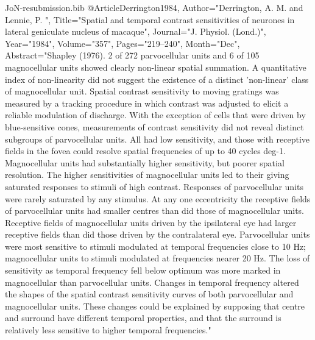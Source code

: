 \documentclass{article}
\begin{document}
\begin{filecontents}{JoN-resubmission.bib}
@Article{Derrington1984,
   Author="Derrington, A. M.  and Lennie, P. ",
   Title="{{S}patial and temporal contrast sensitivities of neurones in lateral geniculate nucleus of macaque}",
   Journal="J. Physiol. (Lond.)",
   Year="1984",
   Volume="357",
   Pages="219--240",
   Month="Dec",
   Abstract="Shapley (1976). 2 of 272 parvocellular units and 6 of 105
magnocellular units showed clearly non-linear spatial summation. A
quantitative index of non-linearity did not suggest the existence of a
distinct 'non-linear' class of magnocellular unit. Spatial contrast
sensitivity to moving gratings was measured by a tracking procedure in
which contrast was adjusted to elicit a reliable modulation of
discharge. With the exception of cells that were driven by
blue-sensitive cones, measurements of contrast sensitivity did not
reveal distinct subgroups of parvocellular units. All had low
sensitivity, and those with receptive fields in the fovea could
resolve spatial frequencies of up to 40 cycles deg-1. Magnocellular
units had substantially higher sensitivity, but poorer spatial
resolution. The higher sensitivities of magnocellular units led to
their giving saturated responses to stimuli of high
contrast. Responses of parvocellular units were rarely saturated by
any stimulus. At any one eccentricity the receptive fields of
parvocellular units had smaller centres than did those of
magnocellular units. Receptive fields of magnocellular units driven by
the ipsilateral eye had larger receptive fields than did those driven
by the contralateral eye. Parvocellular units were most sensitive to
stimuli modulated at temporal frequencies close to 10 Hz;
magnocellular units to stimuli modulated at frequencies nearer 20
Hz. The loss of sensitivity as temporal frequency fell below optimum
was more marked in magnocellular than parvocellular units. Changes in
temporal frequency altered the shapes of the spatial contrast
sensitivity curves of both parvocellular and magnocellular
units. These changes could be explained by supposing that centre and
surround have different temporal properties, and that the surround is
relatively less sensitive to higher temporal frequencies."  }


\end{filecontents}
\end{document}
